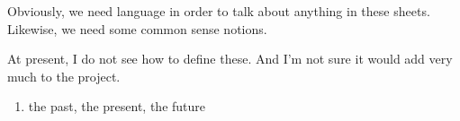 
Obviously, we need language
in order to talk about anything
in these sheets.
Likewise, we need some common
sense notions.

At present, I do not see how to
define these. And I'm not sure
it would add very much to the project.

\begin{enumerate}
\item the past, the present, the future
\end{enumerate}
